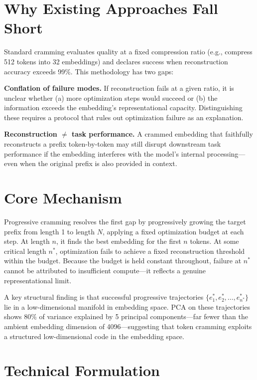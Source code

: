 \documentclass[10pt,twocolumn]{article}
\begin{document}
\section{Why Existing Approaches Fall Short}

Standard cramming evaluates quality at a fixed compression ratio (e.g.,
compress 512 tokens into 32 embeddings) and declares success when
reconstruction accuracy exceeds 99\%. This methodology has two gaps:

\textbf{Conflation of failure modes.} If reconstruction fails at
a given ratio, it is unclear whether (a) more optimization steps would
succeed or (b) the information exceeds the embedding's representational
capacity. Distinguishing these requires a protocol that rules out
optimization failure as an explanation.

\textbf{Reconstruction $\neq$ task performance.} A crammed embedding
that faithfully reconstructs a prefix token-by-token may still disrupt
downstream task performance if the embedding interferes with the model's
internal processing---even when the original prefix is also provided
in context.

\section{Core Mechanism}

Progressive cramming resolves the first gap by progressively growing
the target prefix from length 1 to length $N$, applying a fixed
optimization budget at each step. At length $n$, it finds the best
embedding for the first $n$ tokens. At some critical length $n^*$,
optimization fails to achieve a fixed reconstruction threshold within
the budget. Because the budget is held constant throughout, failure
at $n^*$ cannot be attributed to insufficient compute---it reflects
a genuine representational limit.

A key structural finding is that successful progressive trajectories
$\{e^*_1, e^*_2, \ldots, e^*_{n^*}\}$ lie in a low-dimensional manifold
in embedding space. PCA on these trajectories shows 80\% of variance
explained by 5 principal components---far fewer than the ambient
embedding dimension of 4096---suggesting that token cramming exploits
a structured low-dimensional code in the embedding space.

\section{Technical Formulation}
\end{document}
